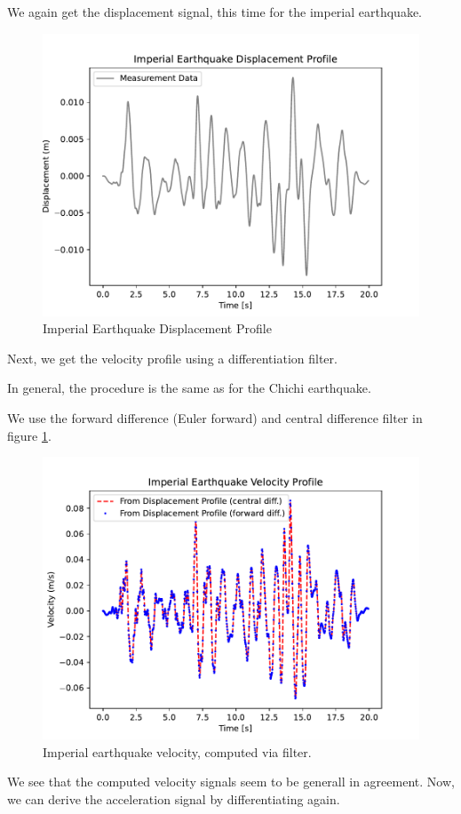 We again get the displacement signal, this time for the imperial earthquake.

\begin{figure}[ht!]
    \centering
    \includegraphics*[width=0.75\columnwidth]{imperial_displacement.pdf}
    \caption{Imperial Earthquake Displacement Profile}
\end{figure}

Next, we get the velocity profile using a differentiation filter. 

In general, the procedure is the same as for the Chichi earthquake.

We use the forward difference (Euler forward) and central difference filter in figure \ref{imperial_velocity}.

\begin{figure}
    \centering
    \includegraphics*[width=0.75\columnwidth]{imperial_velocity.pdf}
    \caption{Imperial earthquake velocity, computed via filter.}
    \label{imperial_velocity}
\end{figure}

We see that the computed velocity signals seem to be generall in agreement. Now, we can derive the acceleration signal by differentiating again. 

